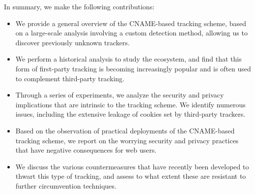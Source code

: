 \medskip
\noindent In summary, we make the following contributions:
\begin{itemize}
	\item We provide a general overview of the CNAME-based tracking scheme, based on a large-scale analysis involving a custom detection method, allowing us to discover previously unknown trackers.
	\item We perform a historical analysis to study the ecosystem, and find that this form of first-party tracking is becoming increasingly popular and is often used to complement third-party tracking.
	\item Through a series of experiments, we analyze the security and privacy implications that are intrinsic to the tracking scheme. We identify numerous issues, including the extensive leakage of cookies set by third-party trackers.
	\item Based on the observation of practical deployments of the CNAME-based tracking scheme, we report on the worrying security and privacy practices that have negative consequences for web users.
	\item We discuss the various countermeasures that have recently been developed to thwart this type of tracking, and assess to what extent these are resistant to further circumvention techniques.
\end{itemize}

